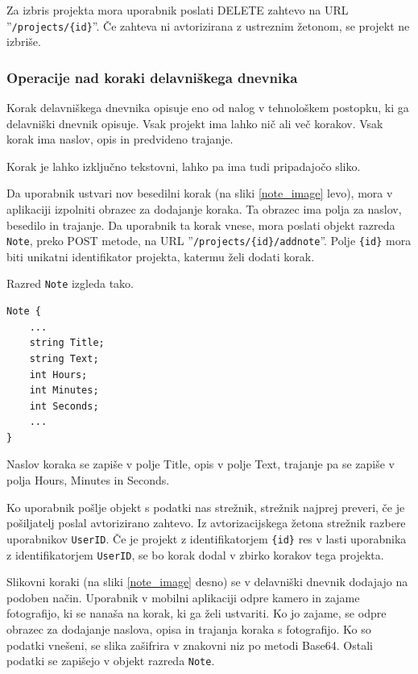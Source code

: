 \documentclass[a4paper, 12pt]{book}
\begin{document}
Za izbris projekta mora uporabnik poslati DELETE zahtevo na URL ''\texttt{/projects/\{id\}}''.
Če zahteva ni avtorizirana z ustreznim žetonom, se projekt ne izbriše.

\subsubsection{Operacije nad koraki delavniškega dnevnika}

Korak delavniškega dnevnika opisuje eno od nalog v tehnološkem postopku, ki ga delavniški dnevnik opisuje.
Vsak projekt ima lahko nič ali več korakov.
Vsak korak ima naslov, opis in predvideno trajanje.


Korak je lahko izključno tekstovni, lahko pa ima tudi pripadajočo sliko.

Da uporabnik ustvari nov besedilni korak (na sliki \ref{note_image} levo), mora v aplikaciji izpolniti obrazec za dodajanje koraka.
Ta obrazec ima polja za naslov, besedilo in trajanje.
Da uporabnik ta korak vnese, mora poslati objekt razreda \texttt{Note}, preko POST metode, na URL ''\texttt{/projects/\{id\}/addnote}''.
Polje \texttt{\{id\}} mora biti unikatni identifikator projekta, katermu želi dodati korak.

\noindent Razred \texttt{Note} izgleda tako.

\begin{verbatim}
Note { 
    ... 
    string Title; 
    string Text; 
    int Hours; 
    int Minutes;
    int Seconds;
    ...
}
\end{verbatim}

Naslov koraka se zapiše v polje Title, opis v polje Text, trajanje pa se zapiše v polja Hours, Minutes in Seconds.

Ko uporabnik pošlje objekt s podatki nas strežnik, strežnik najprej preveri, če je pošiljatelj poslal avtorizirano zahtevo.
Iz avtorizacijskega žetona strežnik razbere uporabnikov \texttt{UserID}. 
Če je projekt z identifikatorjem \texttt{\{id\}} res v lasti uporabnika z identifikatorjem \texttt{UserID}, se bo korak dodal v zbirko korakov tega projekta.

Slikovni koraki (na sliki \ref{note_image} desno) se v delavniški dnevnik dodajajo na podoben način.
Uporabnik v mobilni aplikaciji odpre kamero in zajame fotografijo, ki se nanaša na korak, ki ga želi ustvariti.
Ko jo zajame, se odpre obrazec za dodajanje naslova, opisa in trajanja koraka s fotografijo.
Ko so podatki vnešeni, se slika zašifrira v znakovni niz po metodi Base64.
Ostali podatki se zapišejo v objekt razreda \texttt{Note}.
\end{document}
